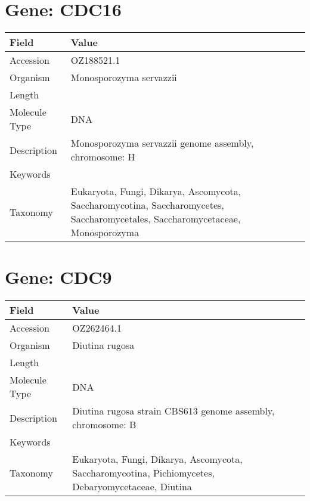 \documentclass[10pt]{article}
\begin{document}
\section*{Gene: CDC16}
{\footnotesize
\begin{longtable}{>{\raggedright\arraybackslash}p{4.5cm} >{\raggedright\arraybackslash}p{11.5cm}}
\textbf{Field} & \textbf{Value} \\
\hline
Accession & OZ188521.1 \\
Organism & Monosporozyma servazzii \\
Length & 901057 \\
Molecule Type & DNA \\
Description & Monosporozyma servazzii genome assembly, chromosome: H \\
Keywords &  \\
Taxonomy & Eukaryota, Fungi, Dikarya, Ascomycota, Saccharomycotina, Saccharomycetes, Saccharomycetales, Saccharomycetaceae, Monosporozyma \\
\end{longtable}
}


\section*{Gene: CDC9}
{\footnotesize
\begin{longtable}{>{\raggedright\arraybackslash}p{4.5cm} >{\raggedright\arraybackslash}p{11.5cm}}
\textbf{Field} & \textbf{Value} \\
\hline
Accession & OZ262464.1 \\
Organism & Diutina rugosa \\
Length & 1704689 \\
Molecule Type & DNA \\
Description & Diutina rugosa strain CBS613 genome assembly, chromosome: B \\
Keywords &  \\
Taxonomy & Eukaryota, Fungi, Dikarya, Ascomycota, Saccharomycotina, Pichiomycetes, Debaryomycetaceae, Diutina \\
\end{longtable}
}
\end{document}
